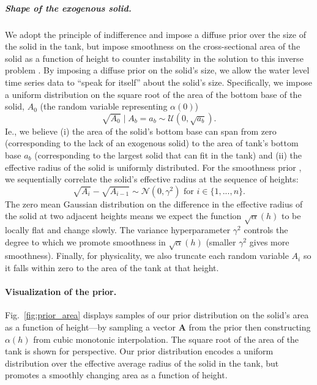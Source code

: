 \documentclass[openacc]{rsproca_new}%
\begin{document}
\vspace{-\baselineskip}
\subparagraph{Shape of the exogenous solid.}
We adopt the principle of indifference and impose a diffuse prior over the size of the solid in the tank, but impose smoothness on the cross-sectional area of the solid as a function of height to counter instability in the solution to this inverse problem \cite{groetsch1993inverse}. 
By imposing a diffuse prior on the solid's size, we allow the water level time series data to ``speak for itself'' about the solid's size.
Specifically, we impose a uniform distribution on the square root of the area of the bottom base of the solid, $A_0$ (the random variable representing $\alpha(0)$)
\begin{equation}
	\sqrt{A_0} \mid A_b=a_b \sim \mathcal{U}(0, \sqrt{a_b}).
\end{equation}
Ie., we believe 
(i) the area of the solid's bottom base can span from zero (corresponding to the lack of an exogenous solid) to the area of tank's bottom base $a_b$ (corresponding to the largest solid that can fit in the tank) and
(ii) the effective radius of the solid is uniformly distributed.
For the smoothness prior \cite{calvetti2018inverse}, we sequentially correlate the solid's effective radius at the sequence of heights: 
\begin{equation}
 \sqrt{A_i} - \sqrt{A_{i-1}} \sim \mathcal{N}(0, \gamma^2) \text{ for } i \in \{1, ..., n\}.
\end{equation} 
The zero mean Gaussian distribution on the difference in the effective radius of the solid at two adjacent heights means we expect the function $\sqrt{\alpha}(h)$ to be locally flat and change slowly. 
The variance hyperparameter $\gamma^2$ controls the degree to which we promote smoothness in $\sqrt{\alpha}(h)$ (smaller $\gamma^2$ gives more smoothness). 
Finally, for physicality, we also truncate each random variable $A_i$ so it falls within zero to the area of the tank at that height.

\paragraph{Visualization of the prior.}
Fig.~\ref{fig:prior_area} displays samples of our prior distribution on the solid's area as a function of height---by sampling a vector $\mathbf{A}$ from the prior then constructing $\alpha(h)$ from cubic monotonic interpolation. The square root of the area of the tank is shown for perspective. 
Our prior distribution encodes a uniform distribution over the effective average radius of the solid in the tank, but promotes a smoothly changing area as a function of height. 
\end{document}
